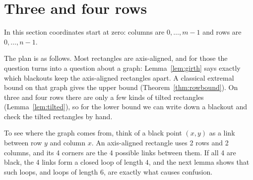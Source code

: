 \section{Three and four rows}\label{sec:narrow}

In this section coordinates start at zero: columns are $0,\ldots,m-1$ and rows
are $0,\ldots,n-1$.

The plan is as follows. Most rectangles are axis-aligned, and for those the
question turns into a question about a graph: Lemma~\ref{lem:girth} says
exactly which blackouts keep the axis-aligned rectangles apart. A classical
extremal bound on that graph gives the upper bound (Theorem~\ref{thm:rowbound}).
On three and four rows there are only a few kinds of tilted rectangles
(Lemma~\ref{lem:tilted}), so for the lower bound we can write down a blackout
and check the tilted rectangles by hand.

To see where the graph comes from, think of a black point $(x,y)$ as a link
between row $y$ and column $x$. An axis-aligned rectangle uses 2 rows and 2
columns, and its 4 corners are the 4 possible links between them. If all 4 are
black, the 4 links form a closed loop of length $4$, and the next lemma shows
that such loops, and loops of length $6$, are exactly what causes confusion.

